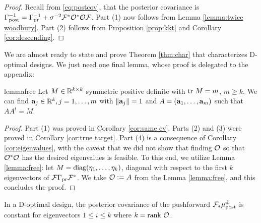 \begin{proof}
  Recall from \eqref{eq:postcov}, that the posterior covariance is
  $\Gamma_{\textup{post}}^{-1} = \Gamma_{\textup{pr}}^{-1} +
  \sigma^{-2}\mathcal{F}^*\mathcal{O}^*\mathcal{O}\mathcal{F}$. Part (1) now follows from Lemma
  \ref{lemma:twice woodbury}. Part (2) follows from Proposition
  \ref{prop:kkt} and Corollary \ref{cor:descending}.
\end{proof}

We are almost ready to state and prove Theorem \ref{thm:char} that
characterizes D-optimal designs. We just need one final lemma, whose
proof is delegated to the appendix:
\begin{restatable*}{lemma}{free}\label{lemma:free}
  Let $M \in \mathbb{R}^{k \times k}$ symmetric positive definite with $\textup{tr}\ M
  = m$, $m \geq k$. We can find $\mathbf{a}_j \in \mathbb{R}^k,j=1,\dots,m$
  with $\|\mathbf{a}_j\|=1$ and $A = (\mathbf{a}_1,\dots,\mathbf{a}_m)$ such that
  $AA^t = M$.
\end{restatable*}


\main*

\begin{proof}
  Part (1) was proved in Corollary \ref{cor:same ev}. Parts (2) and
  (3) were proved in Corollary \ref{cor:true target}. Part (4) is a
  consequence of Corollary \ref{cor:eigenvalues}, with the caveat that
  we did not show that finding $\mathcal{O}$ so that $\mathcal{O}^*\mathcal{O}$ has the
  desired eigenvalues is feasible. To this end, we utilize Lemma
  \ref{lemma:free}: let $M = \textup{diag}(\eta_1, \dots, \eta_k)$, diagonal
  with respect to the first $k$ eigenvectors of $\mathcal{F} \Gamma_{\textup{pr}}
  \mathcal{F}^*$. We take $\mathcal{O} := A$ from the Lemma \ref{lemma:free}, and
  this concludes the proof.
\end{proof}

\begin{corollary}\label{cor:equal eigs}
  In a D-optimal design, the posterior covariance of the pushforward
  $\mathcal{F}_{*} \mu_{\textup{post}}^{\mathbf{d}}$ is constant for eigenvectors $1 \leq i \leq k$
  where $k =\textup{rank}\  \mathcal{O}$.
\end{corollary}

\optimalvsnot

